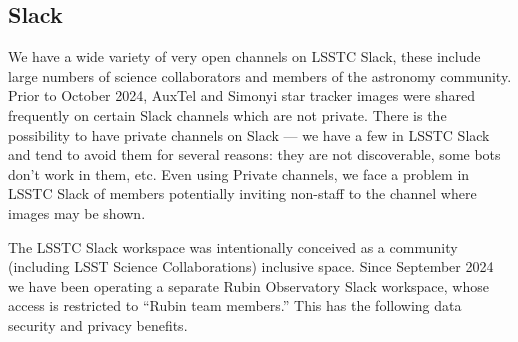 \subsection{Slack} \label{sec:slack}

We have a wide variety of very open channels on LSSTC Slack, these include large numbers of science collaborators and members of the astronomy community.
Prior to October 2024, AuxTel and Simonyi star tracker images were shared frequently on certain Slack channels which are not private.
There is the possibility to have private channels on Slack --- we have a few in LSSTC Slack and tend to avoid them for several reasons: they are not discoverable, some bots don't work in them, etc.
Even using Private channels, we face a problem in LSSTC Slack of members potentially inviting non-staff to the channel where images may be shown.

The LSSTC Slack workspace was intentionally conceived as a community (including LSST Science Collaborations) inclusive space. 
Since September 2024 we have been operating a separate Rubin Observatory Slack workspace, whose access is restricted to ``Rubin team members.''  
This has the following data security and privacy benefits.

